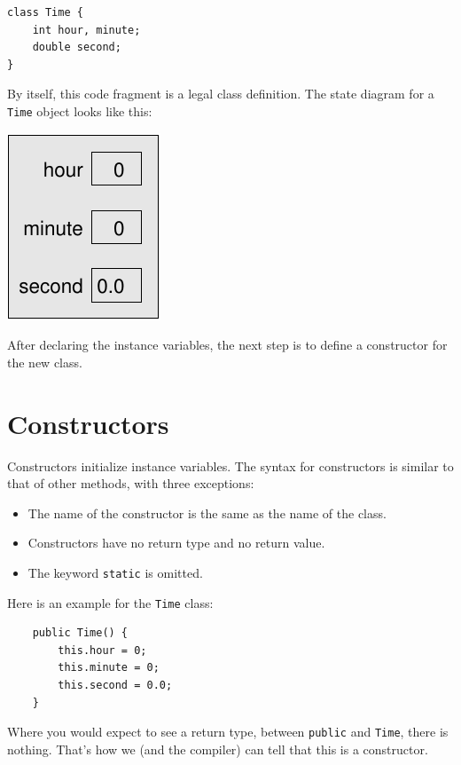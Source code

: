 \begin{lstlisting}
class Time {
    int hour, minute;
    double second;
}
\end{lstlisting}
%
By itself, this code fragment is a legal class definition.  The
state diagram for a {\tt Time} object looks like this:


\includegraphics{figs/time.pdf}


After declaring the instance variables, the next step is
to define a constructor for the new class.

\section{Constructors}

Constructors initialize instance
variables.  The syntax for constructors is similar to that
of other methods, with three exceptions:

\begin{itemize}

\item The name of the constructor is the same as the name of
the class.

\item Constructors have no return type and no return value.

\item The keyword {\tt static} is omitted.

\end{itemize}

Here is an example for the {\tt Time} class:

\begin{lstlisting}
    public Time() {
        this.hour = 0;
        this.minute = 0;
        this.second = 0.0;
    }
\end{lstlisting}
%
Where you would expect to see a return type,
between {\tt public} and {\tt Time}, there is nothing.  That's
how we (and the compiler) can tell that this is a constructor.

